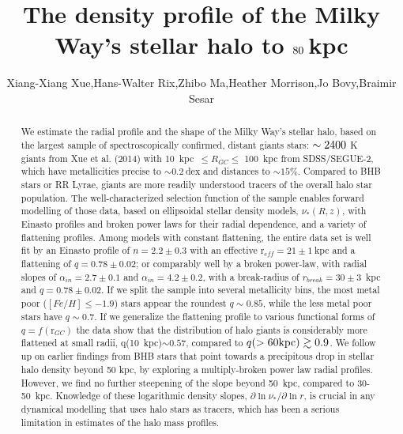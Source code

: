 \documentclass[12pt,preprint]{aastex}
\newcommand{\reff}{\ensuremath{\mathrm{r}_{eff}}}
\newcommand{\rgc}{\ensuremath{\mathrm{r}_{GC}}}
\begin{document}
\title{The density profile of the Milky Way's stellar halo to $\rm 80~$kpc}
\author{Xiang-Xiang Xue,Hans-Walter Rix,Zhibo Ma,Heather Morrison,Jo Bovy,Braimir Sesar}
\begin{abstract}
We estimate the radial profile and the shape of the Milky Way's stellar halo, based on the largest sample
of spectroscopically confirmed, distant giants stars: $\rm \sim 2400$ K giants from Xue et al. (2014) 
with 10~kpc~$\le R_{GC}\le$ 100~kpc from SDSS/SEGUE-2, which have metallicities precise to $\sim 0.2~$dex and distances to $\sim 15\%$. 
Compared to BHB stars or RR Lyrae, giants are more readily understood tracers of the overall halo star population.
The well-characterized selection function of the sample enables forward modelling of those data, based on ellipsoidal stellar density models,
$\nu_* (R,z)$, with Einasto profiles and broken power laws for their radial dependence, and a variety of flattening profiles. 
Among models with constant flattening, the entire data set is well fit by an Einasto profile of $n=2.2\pm 0.3$ with an effective 
$\reff = 21\pm 1~$kpc and a flattening of $q=0.78\pm 0.02$; or comparably well by a broken power-law, with radial slopes of  $\alpha_{in}=2.7\pm 0.1$
  and $\alpha_{in}=4.2\pm 0.2$, with a break-radius of $r_{break}=30\pm 3$~kpc and $q=0.78\pm 0.02$.
   If we split the 
  sample into several metallicity bins, the most metal poor ($[Fe/H]\le -1.9$) stars appear the 
  roundest $q\sim 0.85$, while the less metal poor stars have $q\sim 0.7$. If we generalize 
  the flattening profile to various functional forms of $q = f(\rgc )$ the data show that the 
  distribution of halo giants is considerably more flattened at small radii, q(10~kpc)$\sim 0.57$,  
  compared to $q(>60{\rm kpc})\gtrsim 0.9$. 
We follow up on earlier findings from BHB stars that point towards a precipitous 
drop in stellar halo density beyond 50 kpc, by
exploring a multiply-broken power law radial profiles. However, 
we find no further steepening of the slope beyond 50~kpc, 
compared to 30-50~kpc.
Knowledge of these logarithmic density slopes, $\partial{\ln \nu_*}/\partial{\ln r}$,
 is crucial in any dynamical 
modelling that uses halo stars as tracers, which has been
 a serious limitation in estimates of the halo mass profiles.
\end{abstract}
\end{document}
